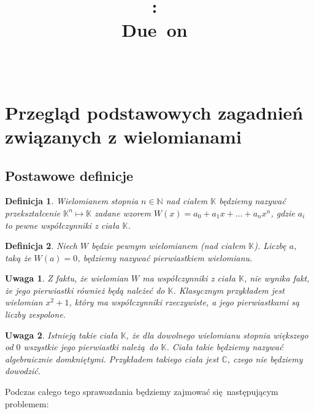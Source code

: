 \documentclass{article}
\title{
\vspace{2in}
\textmd{\textbf{\hmwkClass:\ \hmwkTitle}}\\
\normalsize\vspace{0.1in}\small{Due\ on\ \hmwkDueDate}\\
\vspace{0.1in}\large{\textit{\hmwkClassInstructor\ \hmwkClassTime}}
\vspace{3in}
}
\author{\textbf{\hmwkAuthorName}}
\date{} %
\newtheorem{remark}{Uwaga}
\newtheorem{definicja}{Definicja}
\begin{document}
\tableofcontents

\section{Przegląd podstawowych zagadnień związanych z wielomianami}

\subsection{Postawowe definicje}

\begin{definicja}
Wielomianem stopnia $n \in \mathbb{N}$ nad ciałem $\mathbb{K}$ będziemy nazywać przekształcenie $\mathbb{K}^n \mapsto \mathbb{K}$ zadane wzorem $W(x) = a_0 + a_1x + \ldots + a_n x^n$, gdzie $a_i$ to pewne  współczynniki z ciała $\mathbb{K}$.
\end{definicja}

\begin{definicja}
Niech $W$ będzie pewnym wielomianem (nad ciałem $\mathbb{K}$). Liczbę $a$, taką że $W(a) = 0$, będziemy nazywać pierwiastkiem wielomianu.
\end{definicja}

\begin{remark}
Z faktu, że wielomian $W$ ma współczynniki z ciała $\mathbb{K}$, nie wynika fakt, że jego pierwiastki również będą należeć do $\mathbb{K}$. Klasycznym przykładem jest wielomian $x^2 + 1$, który ma współczynniki rzeczywiste, a jego pierwiastkami są liczby zespolone.
\end{remark}

\begin{remark}
Istnieją takie ciała $\mathbb{K}$, że dla dowolnego wielomianu stopnia większego od $0$ wszystkie jego pierwiastki należą do $\mathbb{K}$. Ciała takie będziemy nazywać algebraicznie domkniętymi. Przykładem takiego ciała jest $\mathbb{C}$, czego nie będziemy dowodzić. 
\end{remark}

Podczas całego tego sprawozdania będziemy zajmować się następującym problemem:

\begin{center}
\end{center}
\end{document}
